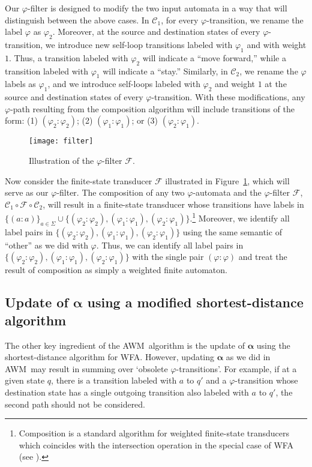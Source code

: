 \documentclass{article}
\newcommand{\sC}{\mathscr C}
\newcommand{\sF}{\mathscr F}
\newcommand{\balpha}{{\boldsymbol \alpha}}
\renewcommand{\phi}{\varphi}
\newcommand{\AWM}{\textsc{AWM}}
\begin{document}
Our $\phi$-filter is designed to modify the two input automata in a way
that will distinguish between the above cases. In
$\sC_1$, for every $\phi$-transition, we rename the label $\phi$ as
$\phi_2$. Moreover, at the source and destination states of every
$\phi$-transition, we introduce new self-loop transitions labeled with
$\phi_1$ and with weight $1$.  Thus, a transition labeled with
$\phi_2$ will indicate a ``move forward,'' while a transition labeled
with $\phi_1$ will indicate a ``stay.''  Similarly, in $\sC_2$, we
rename the $\phi$ labels as $\phi_1$, and we introduce self-loops
labeled with $\phi_2$ and weight $1$ at the source and destination
states of every $\phi$-transition. With these modifications, any
$\phi$-path resulting from the composition algorithm will include
transitions of the form: (1) $(\phi_2 : \phi_2)$; (2)
$(\phi_1 : \phi_1)$; or (3) $(\phi_2 : \phi_1)$. 
\begin{figure}[t]
  \centering
  \texttt{[image: filter]} 
  \caption{Illustration of the $\phi$-filter $\sF$.}  
  \label{fig:filter}
\end{figure}

Now consider the finite-state transducer $\sF$ illustrated in
Figure~\ref{fig:filter}, which will serve as our $\phi$-filter.  The
composition of any two $\phi$-automata and the $\phi$-filter $\sF$,
$\sC_1 \circ \sF \circ \sC_2$, will result in a finite-state
transducer whose transitions have labels in
$\{(a:a)\}_{a \in \Sigma} \cup \{(\phi_2:\phi_2), (\phi_1: \phi_1),
(\phi_2:\phi_1)\}$.\footnote{Composition is a standard algorithm for
  weighted finite-state transducers which coincides with the
  intersection operation in the special case of WFA (see \cite{Mohri2009}).}
Moreover, we identify all label pairs in
$\{(\phi_2:\phi_2), (\phi_1: \phi_1), (\phi_2:\phi_1)\}$ using the
same semantic of ``other'' as we did with $\phi$. Thus, we can
identify all label pairs in
$\{(\phi_2:\phi_2), (\phi_1: \phi_1), (\phi_2:\phi_1)\}$ with the
single pair $(\phi:\phi)$ and treat the result of composition as
simply a weighted finite automaton.

\subsection{Update of $\balpha$ using a modified shortest-distance algorithm}

The other key ingredient of the \AWM\ algorithm is the update of $\balpha$
using the shortest-distance algorithm for WFA.
However, updating $\balpha$ as we did in \AWM\ may result in summing
over  `obsolete $\phi$-transitions'.  For
example, if at a given state $q$, there is a transition labeled with
$a$ to $q'$ and a $\phi$-transition whose destination state has a
single outgoing transition also labeled with $a$ to $q'$, the second
path should not be considered.
\end{document}
